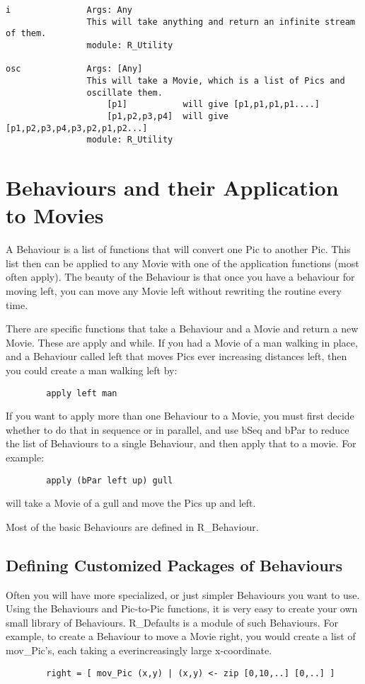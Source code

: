\begin{verbatim}
i               Args: Any		
                This will take anything and return an infinite stream of them.
                module: R_Utility

osc             Args: [Any]
                This will take a Movie, which is a list of Pics and 
                oscillate them. 
                    [p1]           will give [p1,p1,p1,p1....]
                    [p1,p2,p3,p4]  will give [p1,p2,p3,p4,p3,p2,p1,p2...]
                module: R_Utility
\end{verbatim}

\section{Behaviours and their Application to Movies}

	A Behaviour is a list of functions that will convert one Pic to
another Pic. This list then can be applied to any Movie with one
of the application functions (most often apply). The beauty of the Behaviour
is that once you have a behaviour for moving left, you can move any
Movie left without rewriting the routine every time.
  
	There are specific functions that take a Behaviour and a Movie and
return a new Movie. These are apply and while. If you had a Movie of a
man walking in place, and a Behaviour called left that moves Pics ever
increasing distances left, then you could create a man walking left by:
\begin{verbatim}
        apply left man
\end{verbatim}

	If you want to apply more than one Behaviour to a Movie, you must first
decide whether to do that in sequence or in parallel, and use bSeq and bPar
to reduce the list of Behaviours to a single Behaviour, and then apply
that to a movie. For example:
\begin{verbatim}
        apply (bPar left up) gull
\end{verbatim}
will take a Movie of a gull and move the Pics up and left.

	Most of the basic Behaviours are defined in R\_Behaviour. 

    
\subsection{Defining Customized Packages of Behaviours}

	Often you will have more specialized, or just simpler Behaviours you
want to use. Using the Behaviours and Pic-to-Pic functions, it is very
easy to create your own small library of Behaviours. R\_Defaults is a
module of such Behaviours. For example, to create a Behaviour to move
a Movie right, you  would create a list of mov\_Pic's, each taking a
everincreasingly large x-coordinate.
\begin{verbatim}
        right = [ mov_Pic (x,y) | (x,y) <- zip [0,10,..] [0,..] ] 
\end{verbatim}

